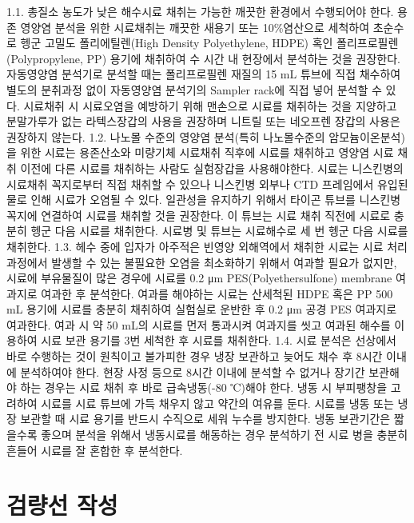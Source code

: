 \documentclass[
]{book}
\begin{document}
1.1. 총질소 농도가 낮은 해수시료 채취는 가능한 깨끗한 환경에서 수행되어야 한다. 용존 영양염 분석을 위한 시료채취는 깨끗한 새용기 또는 10\%염산으로 세척하여 초순수로 헹군 고밀도 폴리에틸렌(High Density Polyethylene, HDPE) 혹인 폴리프로필렌(Polypropylene, PP) 용기에 채취하여 수 시간 내 현장에서 분석하는 것을 권장한다. 자동영양염 분석기로 분석할 때는 폴리프로필렌 재질의 15 mL 튜브에 직접 채수하여 별도의 분취과정 없이 자동영양염 분석기의 Sampler rack에 직접 넣어 분석할 수 있다. 시료채취 시 시료오염을 예방하기 위해 맨손으로 시료를 채취하는 것을 지양하고 분말가루가 없는 라텍스장갑의 사용을 권장하며 니트릴 또는 네오프렌 장갑의 사용은 권장하지 않는다.
1.2. 나노몰 수준의 영양염 분석(특히 나노몰수준의 암모늄이온분석)을 위한 시료는 용존산소와 미량기체 시료채취 직후에 시료를 채취하고 영양염 시료 채취 이전에 다른 시료를 채취하는 사람도 실험장갑을 사용해야한다. 시료는 니스킨병의 시료채취 꼭지로부터 직접 채취할 수 있으나 니스킨병 외부나 CTD 프레임에서 유입된 물로 인해 시료가 오염될 수 있다. 일관성을 유지하기 위해서 타이곤 튜브를 니스킨병 꼭지에 연결하여 시료를 채취할 것을 권장한다. 이 튜브는 시료 채취 직전에 시료로 충분히 헹군 다음 시료를 채취한다. 시료병 및 튜브는 시료해수로 세 번 헹군 다음 시료를 채취한다.
1.3. 헤수 중에 입자가 아주적은 빈영양 외해역에서 채취한 시료는 시료 처리 과정에서 발생할 수 있는 불필요한 오염을 최소화하기 위해서 여과할 필요가 없지만, 시료에 부유물질이 많은 경우에 시료를 0.2 μm PES(Polyethersulfone) membrane 여과지로 여과한 후 분석한다. 여과를 해야하는 시료는 산세척된 HDPE 혹은 PP 500 mL 용기에 시료를 충분히 채취하여 실험실로 운반한 후 0.2 μm 공경 PES 여과지로 여과한다. 여과 시 약 50 mL의 시료를 먼저 통과시켜 여과지를 씻고 여과된 해수를 이용하여 시료 보관 용기를 3번 세척한 후 시료를 채취한다.
1.4. 시료 분석은 선상에서 바로 수행하는 것이 원칙이고 불가피한 경우 냉장 보관하고 늦어도 채수 후 8시간 이내에 분석하여야 한다. 현장 사정 등으로 8시간 이내에 분석할 수 없거나 장기간 보관해야 하는 경우는 시료 채취 후 바로 급속냉동(-80 ℃)해야 한다. 냉동 시 부피팽창을 고려하여 시료를 시료 튜브에 가득 채우지 않고 약간의 여유를 둔다. 시료를 냉동 또는 냉장 보관할 때 시료 용기를 반드시 수직으로 세워 누수를 방지한다. 냉동 보관기간은 짧을수록 좋으며 분석을 위해서 냉동시료를 해동하는 경우 분석하기 전 시료 병을 충분히 흔들어 시료를 잘 혼합한 후 분석한다.

\hypertarget{uxac80uxb7c9uxc120-uxc791uxc131-1}{%
\section{검량선 작성}\label{uxac80uxb7c9uxc120-uxc791uxc131-1}}
\end{document}
